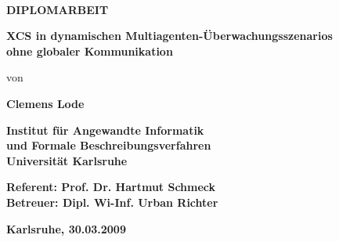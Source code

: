 \thispagestyle{empty}
\topmargin 0.8cm

\begin{center}
~
\vspace{0cm}

{\large \textbf{DIPLOMARBEIT}}

\vspace{1.8cm}
\parbox{0.9\textwidth}{
  \begin{center}
    \large \textbf{%
		XCS in dynamischen Multiagenten-\"Uberwachungsszenarios \\ [1.2ex]
		ohne globaler Kommunikation
      }
  \end{center}
  }

\vspace{1.1cm}

{\fontsize{11pt}{12} \selectfont%
  von
}
\vspace{0.8cm}

{\fontsize{12pt}{12} \selectfont%
  \textbf{Clemens Lode}
}

\vspace{3cm}


{\fontsize{12pt}{12} \selectfont%
  \textbf{Institut f\"ur Angewandte Informatik\\
	 und Formale Beschreibungsverfahren}
}\\

{\fontsize{12pt}{12} \selectfont%
  \textbf{Universit\"at Karlsruhe}
}\\

\vspace{1cm}


\textbf{Referent: Prof. Dr. Hartmut Schmeck}\\
\textbf{Betreuer: Dipl. Wi-Inf. Urban Richter}

\vspace{2cm}
\textbf{Karlsruhe, 30.03.2009}


\end{center}


